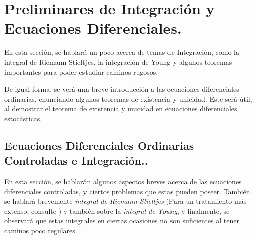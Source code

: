 
















\section{Preliminares de Integración y Ecuaciones Diferenciales.}

En esta sección, se hablará un poco acerca de temas de Integración, como la integral de Riemann-Stieltjes, la integración de Young y algunos teoremas importantes para poder estudiar caminos rugosos.

De igual forma, se verá una breve introducción a las ecuaciones diferenciales ordinarias, enunciando algunos teoremas de existencia y unicidad. Este será útil, al demostrar el teorema de existencia y unicidad en ecuaciones diferenciales estocásticas.







\subsection{Ecuaciones Diferenciales Ordinarias Controladas e Integración..}


En esta sección, se hablarán algunos aspectos breves acerca de las ecuaciones diferenciales controladas, y ciertos problemas que estas pueden poseer. También se hablará brevemente \textit{integral de Riemann-Stieltjes} (Para un tratamiento más extenso, consulte \cite{Mathematical_Analysis_Apostol}) y también sobre la \textit{integral de Young}, y finalmente, se observará que estas integrales en ciertas ocasiones no son suficientes al tener caminos poco regulares.


